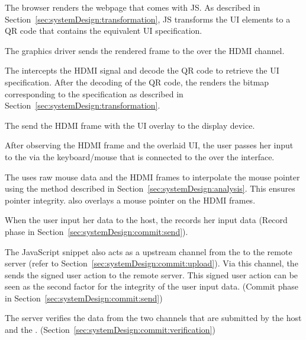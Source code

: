 \begin{mylist}
  \item[\one] The browser renders the webpage that comes with \name JS. As described in Section~\ref{sec:systemDesign:transformation}, \name JS transforms the UI elements to a QR code that contains the equivalent UI specification.
  \item[\two] The graphics driver sends the rendered frame to the \device over the HDMI channel.
  \item[\three] The \device intercepts the HDMI signal and decode the QR code to retrieve the UI specification. After the decoding of the QR code, the \device renders the bitmap corresponding to the specification as described in Section~\ref{sec:systemDesign:transformation}.
  \item[\four] The \device send the HDMI frame with the UI overlay to the display device.
  \item[\five] After observing the HDMI frame and the overlaid UI, the user passes her input to the \device via the keyboard/mouse that is connected to the \device over the \usb interface.
  \item[\six] The \device uses raw mouse data and the HDMI frames to interpolate the mouse pointer using the method described in Section~\ref{sec:systemDesign:analysis}. This ensures pointer integrity. \device also overlays a mouse pointer on the HDMI frames.
  \item[\seven] When the user input her data to the host, the \device records her input data (Record phase in Section~\ref{sec:systemDesign:commit:send}).
  \item[\eight] The \name JavaScript snippet also acts as a upstream channel from the \device to the remote server (refer to Section~\ref{sec:systemDesign:commit:upload}). Via this channel, the \device sends the signed user action to the remote server. This signed user action can be seen as the second factor for the integrity of the user input data. (Commit phase in Section~\ref{sec:systemDesign:commit:send})
  \item [\nine] The server verifies the data from the two channels that are submitted by the host and the \device. (Section~\ref{sec:systemDesign:commit:verification})
\end{mylist}

